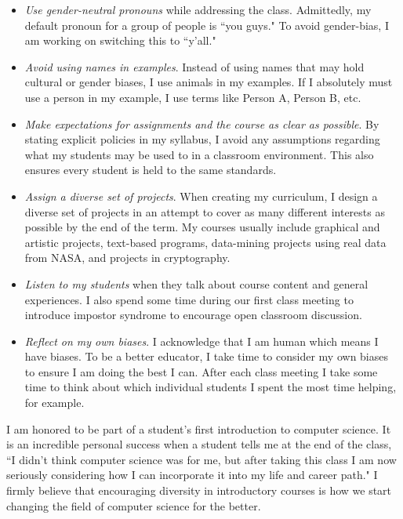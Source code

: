\documentclass[12pt]{amsart} \usepackage{amssymb}
\begin{document}
\begin{itemize}
\item \emph{Use gender-neutral pronouns} while addressing the class. Admittedly, my default pronoun for a group of people is ``you guys." To avoid gender-bias, I am working on switching this to ``y'all."  \vspace{2mm}
\item \emph{Avoid using names in examples}. Instead of using names that may hold cultural or gender biases, I use animals in my examples. If I absolutely must use a person in my example, I use terms like Person A, Person B, etc.
\vspace{2mm}
\item \emph{Make expectations for assignments and the course as clear as possible}. By stating explicit policies in my syllabus, I avoid any assumptions regarding what my students may be used to in a classroom environment. This also ensures every student is held to the same standards.
\vspace{2mm}
\item \emph{Assign a diverse set of projects}. When creating my curriculum, I design a diverse set of projects in an attempt to cover as many different interests as possible by the end of the term. My courses usually include graphical and artistic projects, text-based programs, data-mining projects using real data from NASA, and projects in cryptography.
\vspace{2mm}
\item \emph{Listen to my students} when they talk about course content and general experiences. I also spend some time during our first class meeting to introduce impostor syndrome to encourage open classroom discussion.
\vspace{2mm}
\item \emph{Reflect on my own biases}. I acknowledge that I am human which means I have biases. To be a better educator, I take time to consider my own biases to ensure I am doing the best I can. After each class meeting I take some time to think about which individual students I spent the most time helping, for example.
\end{itemize}

I am honored to be part of a student's first introduction to computer science. It is an incredible personal success when a student tells me at the end of the class, ``I didn't think computer science was for me, but after taking this class I am now seriously considering how I can incorporate it into my life and career path." I firmly believe that encouraging diversity in introductory courses is how we start changing the field of computer science for the better.
\end{document}
